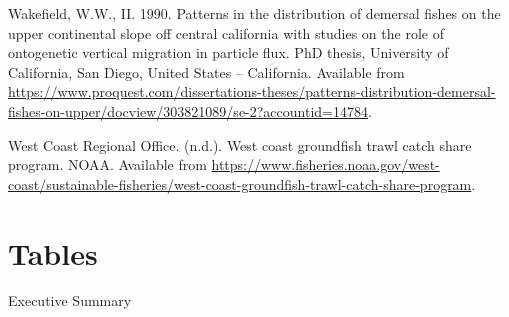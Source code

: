 \documentclass[11pt,
  english,
  letterpaper,
]{article}
\newlength{\cslhangindent}
\newenvironment{CSLReferences}[2] %
 {%
  \setlength{\parindent}{0pt}
  \ifodd #1 \everypar{\setlength{\hangindent}{\cslhangindent}}\ignorespaces\fi
  \ifnum #2 > 0
  \setlength{\parskip}{#2\baselineskip}
  \fi
 }%
 {}
\begin{document}
\begin{CSLReferences}{1}{0}
\leavevmode{}%
Wakefield, W.W., II. 1990. Patterns in the distribution of demersal fishes on the upper continental slope off central california with studies on the role of ontogenetic vertical migration in particle flux. PhD thesis, University of California, San Diego, United States -- California. Available from \url{https://www.proquest.com/dissertations-theses/patterns-distribution-demersal-fishes-on-upper/docview/303821089/se-2?accountid=14784}.

\leavevmode{}%
West Coast Regional Office. (n.d.). West coast groundfish trawl catch share program. {NOAA}. Available from \url{https://www.fisheries.noaa.gov/west-coast/sustainable-fisheries/west-coast-groundfish-trawl-catch-share-program}.

\end{CSLReferences}

\clearpage

\hypertarget{tables}{%
\section{Tables}\label{tables}}

Executive Summary \begingroup\fontsize{10}{12}\selectfont \begingroup\fontsize{10}{12}\selectfont
\end{document}
